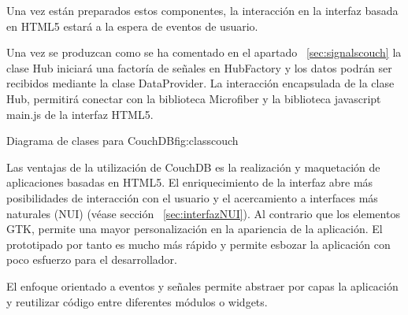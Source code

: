 Una vez están preparados estos componentes, la interacción en la interfaz basada
en HTML5 estará a la espera de eventos de usuario.

Una vez se produzcan como se ha comentado en el apartado ~\ref{sec:signalscouch}
la clase Hub iniciará una factoría de señales en HubFactory y los datos podrán
ser recibidos mediante la clase DataProvider. La interacción encapsulada de la
clase Hub, permitirá conectar con la biblioteca Microfiber y la biblioteca
javascript main.js de la interfaz HTML5.

\newpage

%
{Diagrama de clases para CouchDB}{fig:classcouch}

\newpage

Las ventajas de la utilización de CouchDB es la realización y maquetación de
aplicaciones basadas en HTML5. El enriquecimiento de la interfaz abre más
posibilidades de interacción con el usuario y el acercamiento a interfaces
más naturales (NUI) (véase sección ~\ref{sec:interfazNUI}). Al contrario que
los elementos GTK, permite una mayor personalización en la apariencia de la
aplicación. El prototipado por tanto es mucho más rápido y permite esbozar la
aplicación con poco esfuerzo para el desarrollador.

El enfoque orientado a eventos y señales permite abstraer por capas la aplicación
y reutilizar código entre diferentes módulos o widgets.

